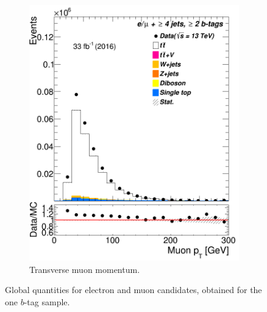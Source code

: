 \begin{figure}
\begin{subfigure}{0.25\textwidth}
	\includegraphics[width=\linewidth]{ControlPlots_emujets_2016_4incl_2incl/mu_pt_emujets_2016.png}
	\caption{Transverse muon momentum.} \label{fig:f31}
\end{subfigure}

		\caption{Global quantities for electron and muon candidates, obtained for the one $b$-tag sample.}
\end{figure}


	
	
	
	
